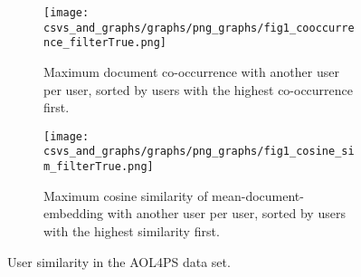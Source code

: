 \documentclass[10pt,journal]{IEEEtran}
\begin{document}
%             
%             
\begin{figure}
    \centering
    \begin{subfigure}{0.45\textwidth} %
        \texttt{[image: csvs\_and\_graphs/graphs/png\_graphs/fig1\_cooccurrence\_filterTrue.png]}
        \caption{Maximum document co-occurrence with another user per user, sorted by users with the highest co-occurrence first.}
        \label{fig:user_similarity_aol4ps_filtered_dataset}
    \end{subfigure}
    \hfill %
    \begin{subfigure}{0.45\textwidth} %
        \texttt{[image: csvs\_and\_graphs/graphs/png\_graphs/fig1\_cosine\_sim\_filterTrue.png]}
        \caption{Maximum cosine similarity of mean-document-embedding with another user per user, sorted by users with the highest similarity first.}
        \label{fig:cosine_sim_aol4ps_filtered_dataset}
    \end{subfigure}
    \caption{User similarity in the AOL4PS data set.}
\end{figure}
\end{document}
